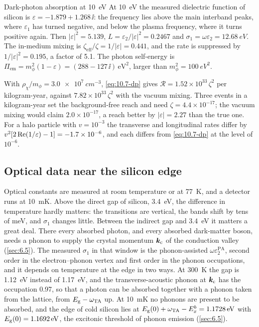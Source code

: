 \begin{workedexample}{Dark-photon absorption at \SI{10}{eV}}\label{we:10-darkphoton}
At \SI{10}{eV} the measured dielectric function of silicon is $\varepsilon = -1.879 + 1.268\,\ii$: the frequency lies above the main interband peaks, where $\varepsilon_1$ has turned negative, and below the plasma frequency, where it turns positive again. Then $|\varepsilon|^2 = 5.139$, $L = \varepsilon_2/|\varepsilon|^2 = 0.2467$ and $\sigma_1 = \omega\varepsilon_2 = \SI{12.68}{eV}$. The in-medium mixing is $\zeta_{\mathrm{eff}}/\zeta = 1/|\varepsilon| = 0.441$, and the rate is suppressed by $1/|\varepsilon|^2 = 0.195$, a factor of 5.1. The photon self-energy is $\Pi_{\mathrm{em}} = m_\phi^2(1 - \varepsilon) = (288 - 127\,\ii)\,\mathrm{eV}^2$, larger than $m_\phi^2 = \SI{100}{eV^2}$.

With $\rho_\chi/m_\phi = \SI{3.0e7}{cm^{-3}}$, \cref{eq:10.7-dp} gives $\mathcal{R} = 1.52\times10^{33}\,\zeta^2$ per kilogram-year, against $7.82\times10^{33}\,\zeta^2$ with the vacuum mixing. Three events in a kilogram-year set the background-free reach and need $\zeta = 4.4\times10^{-17}$; the vacuum mixing would claim $2.0\times10^{-17}$, a reach better by $|\varepsilon| = 2.27$ than the true one. For a halo particle with $v = 10^{-3}$ the transverse and longitudinal rates differ by $v^2[2\operatorname{Re}(1/\varepsilon) - 1] = -1.7\times10^{-6}$, and each differs from \cref{eq:10.7-dp} at the level of $10^{-6}$.
\end{workedexample}

\subsection{Optical data near the silicon edge}\label{sec:10.7-edge}

Optical constants are measured at room temperature or at \SI{77}{K}, and a detector runs at \SI{10}{mK}. Above the direct gap of silicon, \SI{3.4}{eV}, the difference in temperature hardly matters: the transitions are vertical, the bands shift by tens of meV, and $\sigma_1$ changes little. Between the indirect gap and \SI{3.4}{eV} it matters a great deal. There every absorbed photon, and every absorbed dark-matter boson, needs a phonon to supply the crystal momentum $\bm{k}_{\mathrm{c}}$ of the conduction valley (\cref{sec:6.5}). The measured $\sigma_1$ in that window is the phonon-assisted $\omega\varepsilon_2^{\mathrm{PA}}$, second order in the electron--phonon vertex and first order in the phonon occupations, and it depends on temperature at the edge in two ways. At \SI{300}{K} the gap is \SI{1.12}{eV} instead of \SI{1.17}{eV}, and the transverse-acoustic phonon at $\bm{k}_{\mathrm{c}}$ has the occupation 0.97, so that a photon can be absorbed together with a phonon taken from the lattice, from $E_{\mathrm{g}} - \omega_{\mathrm{TA}}$ up. At \SI{10}{mK} no phonons are present to be absorbed, and the edge of cold silicon lies at $E_{\mathrm{g}}(0) + \omega_{\mathrm{TA}} - E_x^b = \SI{1.1728}{eV}$ with $E_{\mathrm{g}}(0) = \SI{1.1692}{eV}$, the excitonic threshold of phonon emission (\cref{sec:6.5}).

